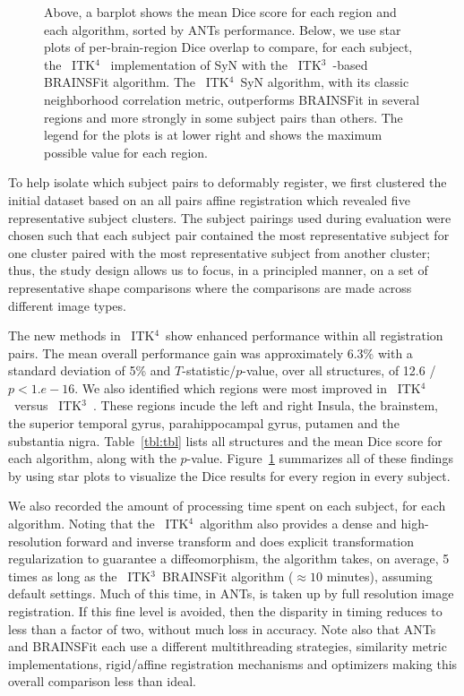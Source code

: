 \documentclass{frontiersSCNS}
\newcommand{\tk}{~ITK$^{\text{4}}$~}
\newcommand{\tkt}{~ITK$^{\text{3}}$~}
\begin{document}
\begin{figure}[t]
\begin{center}
\caption{Above, a barplot shows the mean Dice score for each region
  and each algorithm, sorted by ANTs performance.  Below, we use star plots of
  per-brain-region Dice overlap to compare, for each subject, the \tk
  implementation of SyN with the \tkt-based BRAINSFit algorithm.  The
  \tk SyN algorithm, with its classic neighborhood correlation
  metric, outperforms BRAINSFit in several regions and more strongly
  in some subject pairs than others.  The legend for the plots is at
  lower right and shows the maximum possible value for each region.}
\label{fig:antsbfit}
\end{center}
\end{figure}

To help isolate which subject pairs to deformably register, 
we first clustered the initial dataset based on an all pairs
affine registration which revealed five representative subject
clusters.   The subject pairings used during evaluation were chosen 
such that each subject pair contained the most representative subject
for one cluster paired with the most representative subject from
another cluster; thus, the study design allows us to focus, in a
principled manner, on a set of representative shape comparisons
where the comparisons are made across different image types.

The new methods in \tk show enhanced performance within all
registration pairs.  The mean overall performance gain was
approximately 6.3\% with a standard deviation of 5\% and
$T$-statistic/$p$-value, over all structures, of 12.6 / $p < 1.e-16$.
We also identified which regions were most improved in \tk versus
\tkt.  These regions incude the left and right Insula, the brainstem,
the superior temporal gyrus, parahippocampal gyrus, putamen and the
substantia nigra.  Table~\ref{tbl:tbl} lists all structures and the
mean Dice score for each algorithm, along with the $p$-value.
Figure~\ref{fig:antsbfit} summarizes all of these findings by using
star plots to visualize the Dice results for every region in every
subject.

We also recorded the amount of processing time spent on each subject,
for each algorithm.  Noting that the \tk algorithm also provides a
dense and high-resolution forward and inverse transform and does
explicit transformation regularization to guarantee a diffeomorphism,
the algorithm takes, on average, 5 times as long as the \tkt BRAINSFit
algorithm ($\approx 10$ minutes), assuming default settings.  Much of
this time, in ANTs, is taken up by full resolution image registration.
If this fine level is avoided, then the disparity in timing reduces
to less than a factor of two, without much loss in accuracy.
Note also that ANTs and BRAINSFit each use a different multithreading
strategies, similarity metric implementations, rigid/affine
registration mechanisms and optimizers making this overall comparison
less than ideal.
\end{document}
